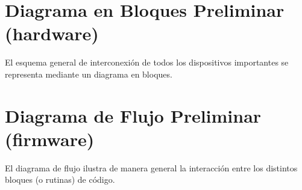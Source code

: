 \section{Diagrama en Bloques Preliminar (hardware)}
\color{blue}El esquema general de interconexión de todos los dispositivos importantes se representa mediante un diagrama en bloques.\color{black}



\section{Diagrama de Flujo Preliminar (firmware)}
\color{blue}El diagrama de flujo ilustra de manera general la interacción entre los distintos bloques (o rutinas) de código.\color{black}



